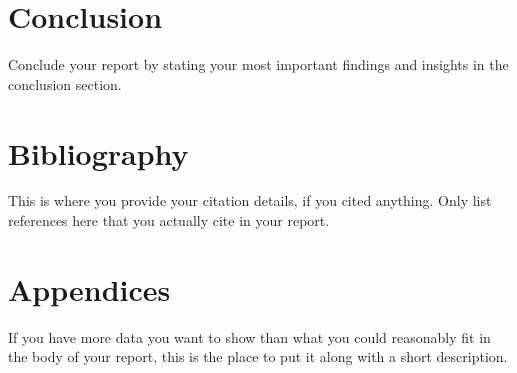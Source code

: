 \documentclass[11pt]{article}
\begin{document}
\section{Conclusion}
Conclude your report by stating your most important findings and insights in the conclusion
section.

\section{Bibliography}
This is where you provide your citation details, if you cited anything. Only list references
here that you actually cite in your report.

\section{Appendices}
If you have more data you want to show than what you could reasonably fit in the body
of your report, this is the place to put it along with a short description.
\end{document}
